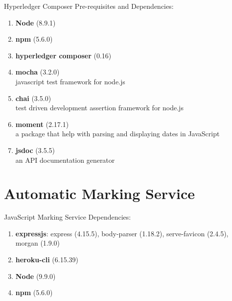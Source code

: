 Hyperledger Composer Pre-requisites and Dependencies:

\begin{enumerate}
	\setlength\itemsep{0em}
	\item \textbf{Node} (8.9.1)
	\item \textbf{npm} (5.6.0)
	\item \textbf{hyperledger composer} (0.16)
	\item \textbf{mocha} (3.2.0)\\
	      javascript test framework for node.js
	\item \textbf{chai} (3.5.0)\\
	      test driven development assertion framework for node.js
	\item \textbf{moment} (2.17.1)\\
	      a package that help with parsing and displaying dates in JavaScript
	\item \textbf{jsdoc} (3.5.5)\\
	      an API documentation generator
\end{enumerate}

\section{Automatic Marking Service}

JavaScript Marking Service Dependencies:

\begin{enumerate}
	\item \textbf{expressjs}: express (4.15.5), body-parser (1.18.2), serve-favicon (2.4.5), morgan (1.9.0)
	\item \textbf{heroku-cli} (6.15.39)
	\item \textbf{Node} (9.9.0)
	\item \textbf{npm} (5.6.0)
\end{enumerate}
